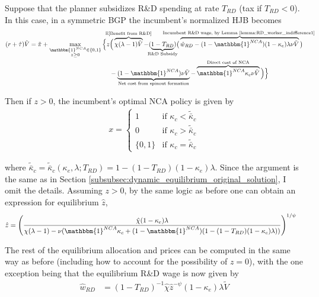 \documentclass[11pt,english]{article}
\begin{document}
Suppose that the planner subsidizes R\&D spending at rate $T_{RD}$ (tax if $T_{RD} < 0$). In this case, in a symmetric BGP the incumbent's normalized HJB becomes
\begin{align}
(r + \hat{\tau}) \tilde{V} = \tilde{\pi} + \max_{\substack{\mathbbm{1}^{NCA} \in \{0,1\} \\ z \ge 0}} \Big\{z &\Big( \overbrace{\chi (\lambda - 1) \tilde{V}}^{\mathclap{\mathbb{E}[\textrm{Benefit from R\&D}]}}- (\underbrace{1-T_{RD}}_{\mathclap{\text{R\&D Subsidy}}}) \big( \overbrace{\hat{w}_{RD} - (1-\mathbbm{1}^{NCA})(1-\kappa_e)\lambda \nu \tilde{V}}^{\mathclap{\text{Incumbent R\&D wage, by Lemma \ref{lemma:RD_worker_indifference1} }}}\big) \label{eq:hjb_incumbent_RDsubsidy} \nonumber \\ 
&-  \underbrace{(1-\mathbbm{1}^{NCA}) \nu \tilde{V}}_{\mathclap{\text{Net cost from spinout formation}}} - \overbrace{\mathbbm{1}^{NCA} \kappa_{c} \nu \tilde{V}}^{\mathclap{\text{Direct cost of NCA}}}\Big) \Big\} 
\end{align}

Then if $z > 0$, the incumbent's optimal NCA policy is given by 
\begin{align}
x = \begin{cases}
1 & \textrm{if } \kappa_{c} < \tilde{\bar{\kappa}}_c  \\
0 & \textrm{if } \kappa_{c} > \tilde{\bar{\kappa}}_c \\
\{0,1\} & \textrm{if } \kappa_c = \tilde{\bar{\kappa}}_c 
\end{cases} \label{eq:nca_policy_RDsubsidy}
\end{align}

where $\tilde{\bar{\kappa}}_c = \tilde{\bar{\kappa}}_c(\kappa_e,\lambda;T_{RD}) = 1 - (1-T_{RD})(1-\kappa_e)\lambda$. Since the argument is the same as in Section \ref{subsubsec:dynamic_equilibrium_original_solution}, I omit the details. Assuming $z > 0$, by the same logic as before one can obtain an expression for equilibrium $\hat{z}$, 
\begin{align}
\hat{z} &= \Bigg( \frac{\hat{\chi} (1-\kappa_{e}) \lambda}{\chi(\lambda -1) - \nu (\mathbbm{1}^{NCA}\kappa_c + (1-\mathbbm{1}^{NCA})(1 - (1-T_{RD})(1-\kappa_e)\lambda)) } \Bigg)^{1/\psi} \label{eq:effort_entrant_RDsubsidy}
\end{align}

The rest of the equilibrium allocation and prices can be computed in the same way as before (including how to account for the possibility of $z = 0$), with the one exception being that the equilibrium R\&D wage is now given by 
\begin{align}
\hat{w}_{RD} &= (1-T_{RD})^{-1}\hat{\chi} \hat{z}^{-\psi} (1-\kappa_e) \lambda \tilde{V} \label{eq:wage_rd_labor_RDsubsidy}
\end{align}
\end{document}
